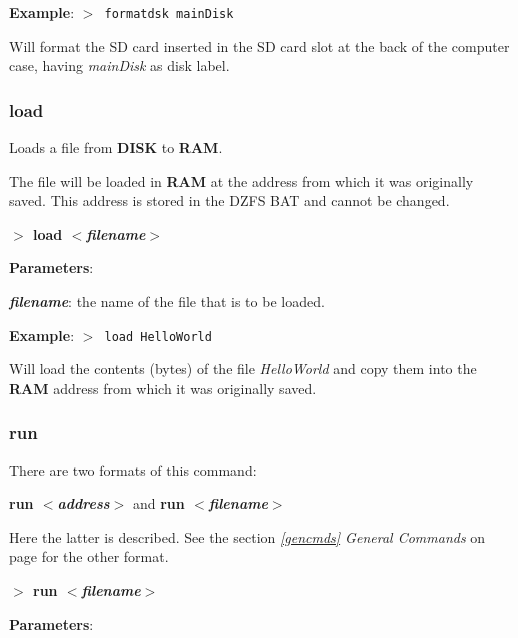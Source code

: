 \documentclass[a4paper,11pt]{article}
\begin{document}
        \textbf{Example}: \texttt{$>$ formatdsk mainDisk}

        Will format the SD card inserted in the SD card slot at the back of the
        computer case, having \textit{mainDisk} as disk label.

        \subsubsection{{\color{blue}load}}
        Loads a file from \textbf{DISK} to \textbf{RAM}.
        
        The file will be loaded in \textbf{RAM} at the address from which it was
        originally saved. This address is stored in the DZFS BAT and cannot be
        changed. 

        \hspace{1.9cm}\textbf{$>$ load \textit{$<$filename$>$}}

        \textbf{Parameters}:

        \hspace{1cm}\textbf{\textit{filename}}: the name of the file that is to
        be loaded.

        \textbf{Example}: \texttt{$>$ load HelloWorld}

        Will load the contents (bytes) of the file \textit{HelloWorld} and copy
        them into the \textbf{RAM} address from which it was originally saved.

        \subsubsection{{\color{blue}run}}
        There are two formats of this command:

        \textbf{run \textit{$<$address$>$}} and \textbf{run 
        \textit{$<$filename$>$}}
        
        Here the latter is described. See the section \textit{\ref{gencmds}
        General Commands} on page \pageref{gencmds} for the other format.

        \hspace{1.9cm}\textbf{$>$ run \textit{$<$filename$>$}}

        \textbf{Parameters}:
\end{document}

